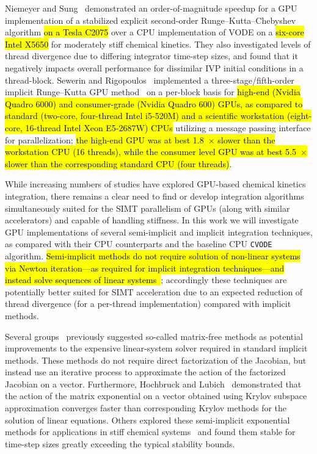 \documentclass[preprint,review,11pt]{elsarticle}
\DeclareRobustCommand{\hlb}[1]{\sethlcolor{SkyBlue}\hl{#1}}
\begin{document}
Niemeyer and Sung~\cite{Niemeyer:2014aa} demonstrated an order-of-magnitude speedup for a GPU implementation of a stabilized explicit second-order Runge--Kutta--Chebyshev algorithm \hlb{on a Tesla C2075} over a CPU implementation of VODE on a \hlb{six-core Intel X5650} for moderately stiff chemical kinetics.
They also investigated levels of thread divergence due to differing integrator time-step sizes, and found that it negatively impacts overall performance for dissimilar IVP initial conditions in a thread-block.
Sewerin and Rigopoulos~\cite{Sewerin20151375} implemented a three-stage\slash fifth-order implicit Runge--Kutta GPU method~\cite{wanner1991solving} on a per-block basis for \hlb{high-end (Nvidia Quadro 6000) and consumer-grade (Nvidia Quadro 600) GPUs, as compared to standard (two-core, four-thread Intel i5-520M) and a scientific workstation (eight-core, 16-thread Intel Xeon E5-2687W) CPUs} utilizing a message passing interface for parallelization; \hlb{the high-end GPU was at best {\SI{1.8}{$\times$}} slower than the workstation CPU (16 threads), while the consumer level GPU was at best {\SI{5.5}{$\times$}} slower than the corresponding standard CPU (four threads)}.

While increasing numbers of studies have explored GPU-based chemical kinetics integration, there remains a clear need to find or develop integration algorithms simultaneously suited for the SIMT parallelism of GPUs (along with similar accelerators) and capable of handling stiffness.
In this work we will investigate GPU implementations of several semi-implicit and implicit integration techniques, as compared with their CPU counterparts and the baseline CPU \texttt{CVODE}~\cite{Hindmarsh:2005hg} algorithm.
\hlb{Semi-implicit methods do not require solution of non-linear systems via Newton iteration---as required for implicit integration techniques---and instead solve sequences of linear systems~\cite{wanner1991solving}}; accordingly these techniques are potentially better suited for SIMT acceleration due to an expected reduction of thread divergence (for a per-thread implementation) compared with implicit methods.

Several groups~\cite{Perini20141180,McNenly2015581} previously suggested so-called matrix-free methods as potential improvements to the expensive linear-system solver required in standard implicit methods.
These methods do not require direct factorization of the Jacobian, but instead use an iterative process to approximate the action of the factorized Jacobian on a vector.
Furthermore, Hochbruck and Lubich~\cite{Hochbruck:1997,Hochbruck:1998} demonstrated that the action of the matrix exponential on a vector obtained using Krylov subspace approximation converges faster than corresponding Krylov methods for the solution of linear equations.
Others explored these semi-implicit exponential methods for applications in stiff chemical systems~\cite{Bisetti:2012jw,falati2011integration} and found them stable for time-step sizes greatly exceeding the typical stability bounds.
\end{document}

